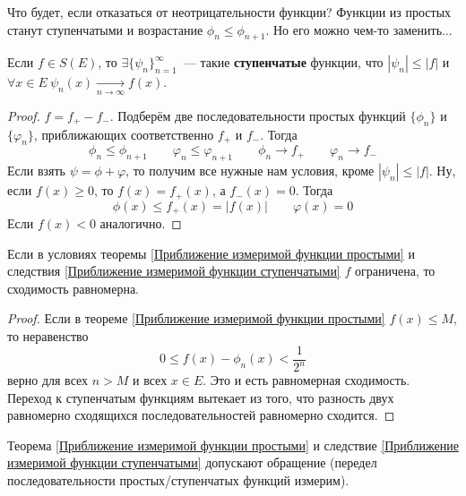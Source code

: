 \documentclass{article}
\begin{document}
    \begin{remark}
        Что будет, если отказаться от неотрицательности функции? Функции из простых станут ступенчатыми и возрастание $\phi_n\leqslant\phi_{n+1}$. Но его можно чем-то заменить...
    \end{remark}
    \begin{corollary}
        \label{Приближение измеримой функции ступенчатыми}
        Если $f\in S(E)$, то $\exists\{\psi_n\}_{n=1}^\infty$~--- такие \textbf{ступенчатые} функции, что $|\psi_n|\leqslant|f|$ и $\forall x\in E~\psi_n(x)\underset{n\to\infty}\longrightarrow f(x)$.
    \end{corollary}
    \begin{proof}
        $f=f_+-f_-$. Подберём две последовательности простых функций $\{\phi_n\}$ и $\{\varphi_n\}$, приближающих соответственно $f_+$ и $f_-$. Тогда
        $$
        \phi_n\leqslant\phi_{n+1}\qquad\varphi_n\leqslant\varphi_{n+1}\qquad\phi_n\rightarrow f_+\qquad\varphi_n\rightarrow f_-
        $$
        Если взять $\psi=\phi+\varphi$, то получим все нужные нам условия, кроме $|\psi_n|\leqslant|f|$. Ну, если $f(x)\geqslant0$, то $f(x)=f_+(x)$, а $f_-(x)=0$. Тогда
        $$
        \phi(x)\leqslant f_+(x)=|f(x)|\qquad\varphi(x)=0
        $$
        Если $f(x)<0$ аналогично.
    \end{proof}
    \begin{corollary}
        Если в условиях теоремы \ref{Приближение измеримой функции простыми} и следствия \ref{Приближение измеримой функции ступенчатыми} $f$ ограничена, то сходимость равномерна.
    \end{corollary}
    \begin{proof}
        Если в теореме \ref{Приближение измеримой функции простыми} $f(x)\leqslant M$, то неравенство
        $$0\leqslant f(x)-\phi_n(x)<\frac1{2^n}$$
        верно для всех $n>M$ и всех $x\in E$. Это и есть равномерная сходимость.\\
        Переход к ступенчатым функциям вытекает из того, что разность двух равномерно сходящихся последовательностей равномерно сходится.
    \end{proof}
    \begin{remark}
        Теорема \ref{Приближение измеримой функции простыми} и следствие \ref{Приближение измеримой функции ступенчатыми} допускают обращение (передел последовательности простых/ступенчатых функций измерим).
    \end{remark}
\end{document}
